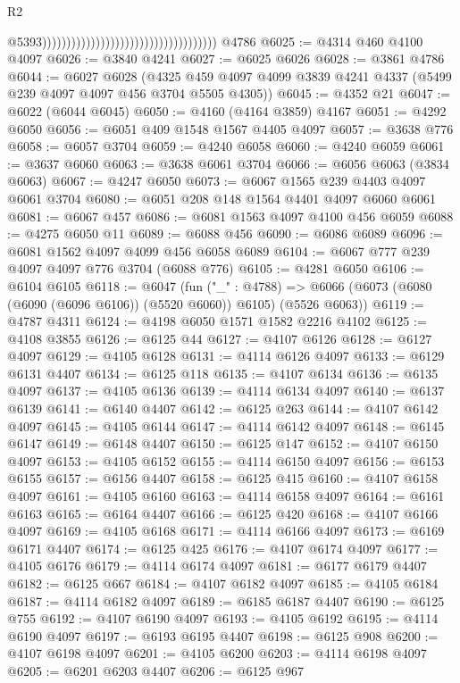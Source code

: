 \begin{lexlean}{R2}
\begin{coremodule}
                                                                            @5393))))))))))))))))))))))))))))))))))))
    @4786
@6025 := @4314 @460 @4100 @4097
@6026 := @3840 @4241
@6027 := @6025 @6026
@6028 := @3861 @4786
@6044 := @6027
    @6028
    (@4325 @459 @4097 @4099 @3839 @4241 @4337 (@5499 @239 @4097 @4097 @456 @3704 @5505 @4305))
@6045 := @4352 @21
@6047 := @6022 (@6044 @6045)
@6050 := @4160 (@4164 @3859) @4167
@6051 := @4292 @6050
@6056 := @6051 @409 @1548 @1567 @4405 @4097
@6057 := @3638 @776
@6058 := @6057 @3704
@6059 := @4240 @6058
@6060 := @4240 @6059
@6061 := @3637 @6060
@6063 := @3638 @6061 @3704
@6066 := @6056 @6063 (@3834 @6063)
@6067 := @4247 @6050
@6073 := @6067 @1565 @239 @4403 @4097 @6061 @3704
@6080 := @6051 @208 @148 @1564 @4401 @4097 @6060 @6061
@6081 := @6067 @457
@6086 := @6081 @1563 @4097 @4100 @456 @6059
@6088 := @4275 @6050 @11
@6089 := @6088 @456
@6090 := @6086 @6089
@6096 := @6081 @1562 @4097 @4099 @456 @6058 @6089
@6104 := @6067 @777 @239 @4097 @4097 @776 @3704 (@6088 @776)
@6105 := @4281 @6050
@6106 := @6104 @6105
@6118 := @6047
    (fun ("_" : @4788) =>
    @6066 (@6073 (@6080 (@6090 (@6096 @6106)) (@5520 @6060)) @6105) (@5526 @6063))
@6119 := @4787 @4311
@6124 := @4198 @6050 @1571 @1582 @2216 @4102
@6125 := @4108 @3855
@6126 := @6125 @44
@6127 := @4107 @6126
@6128 := @6127 @4097
@6129 := @4105 @6128
@6131 := @4114 @6126 @4097
@6133 := @6129 @6131 @4407
@6134 := @6125 @118
@6135 := @4107 @6134
@6136 := @6135 @4097
@6137 := @4105 @6136
@6139 := @4114 @6134 @4097
@6140 := @6137 @6139
@6141 := @6140 @4407
@6142 := @6125 @263
@6144 := @4107 @6142 @4097
@6145 := @4105 @6144
@6147 := @4114 @6142 @4097
@6148 := @6145 @6147
@6149 := @6148 @4407
@6150 := @6125 @147
@6152 := @4107 @6150 @4097
@6153 := @4105 @6152
@6155 := @4114 @6150 @4097
@6156 := @6153 @6155
@6157 := @6156 @4407
@6158 := @6125 @415
@6160 := @4107 @6158 @4097
@6161 := @4105 @6160
@6163 := @4114 @6158 @4097
@6164 := @6161 @6163
@6165 := @6164 @4407
@6166 := @6125 @420
@6168 := @4107 @6166 @4097
@6169 := @4105 @6168
@6171 := @4114 @6166 @4097
@6173 := @6169 @6171 @4407
@6174 := @6125 @425
@6176 := @4107 @6174 @4097
@6177 := @4105 @6176
@6179 := @4114 @6174 @4097
@6181 := @6177 @6179 @4407
@6182 := @6125 @667
@6184 := @4107 @6182 @4097
@6185 := @4105 @6184
@6187 := @4114 @6182 @4097
@6189 := @6185 @6187 @4407
@6190 := @6125 @755
@6192 := @4107 @6190 @4097
@6193 := @4105 @6192
@6195 := @4114 @6190 @4097
@6197 := @6193 @6195 @4407
@6198 := @6125 @908
@6200 := @4107 @6198 @4097
@6201 := @4105 @6200
@6203 := @4114 @6198 @4097
@6205 := @6201 @6203 @4407
@6206 := @6125 @967

\end{coremodule}
\end{lexlean}
